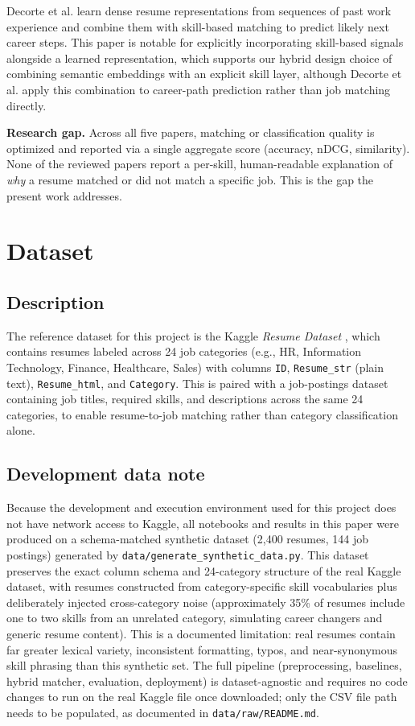 \documentclass[conference]{IEEEtran}
\begin{document}
Decorte et al. \cite{decorte2023} learn dense resume representations from sequences of past work experience and combine them with skill-based matching to predict likely next career steps. This paper is notable for explicitly incorporating skill-based signals alongside a learned representation, which supports our hybrid design choice of combining semantic embeddings with an explicit skill layer, although Decorte et al. apply this combination to career-path prediction rather than job matching directly.

\textbf{Research gap.} Across all five papers, matching or classification quality is optimized and reported via a single aggregate score (accuracy, nDCG, similarity). None of the reviewed papers report a per-skill, human-readable explanation of \emph{why} a resume matched or did not match a specific job. This is the gap the present work addresses.

\section{Dataset}

\subsection{Description}

The reference dataset for this project is the Kaggle \emph{Resume Dataset} \cite{kaggle_resume}, which contains resumes labeled across 24 job categories (e.g., HR, Information Technology, Finance, Healthcare, Sales) with columns \texttt{ID}, \texttt{Resume\_str} (plain text), \texttt{Resume\_html}, and \texttt{Category}. This is paired with a job-postings dataset containing job titles, required skills, and descriptions across the same 24 categories, to enable resume-to-job matching rather than category classification alone.

\subsection{Development data note}

Because the development and execution environment used for this project does not have network access to Kaggle, all notebooks and results in this paper were produced on a schema-matched synthetic dataset (2,400 resumes, 144 job postings) generated by \texttt{data/generate\_synthetic\_data.py}. This dataset preserves the exact column schema and 24-category structure of the real Kaggle dataset, with resumes constructed from category-specific skill vocabularies plus deliberately injected cross-category noise (approximately 35\% of resumes include one to two skills from an unrelated category, simulating career changers and generic resume content). This is a documented limitation: real resumes contain far greater lexical variety, inconsistent formatting, typos, and near-synonymous skill phrasing than this synthetic set. The full pipeline (preprocessing, baselines, hybrid matcher, evaluation, deployment) is dataset-agnostic and requires no code changes to run on the real Kaggle file once downloaded; only the CSV file path needs to be populated, as documented in \texttt{data/raw/README.md}.
\end{document}
